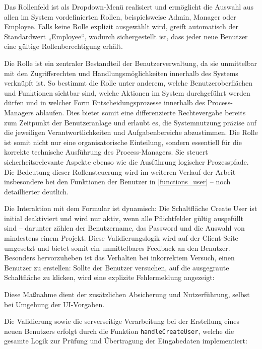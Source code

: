 
Das Rollenfeld ist als Dropdown-Menü realisiert und ermöglicht die Auswahl aus allen im System vordefinierten Rollen, beispielsweise Admin, Manager oder Employee. Falls keine Rolle explizit ausgewählt wird, greift automatisch der Standardwert „Employee“, wodurch sichergestellt ist, dass jeder neue Benutzer eine gültige Rollenberechtigung erhält.

Die Rolle ist ein zentraler Bestandteil der Benutzerverwaltung, da sie unmittelbar mit den Zugriffsrechten und Handlungsmöglichkeiten innerhalb des Systems verknüpft ist. So bestimmt die Rolle unter anderem, welche Benutzeroberflächen und Funktionen sichtbar sind, welche Aktionen im System durchgeführt werden dürfen und in welcher Form Entscheidungsprozesse innerhalb des Process-Managers ablaufen. Dies bietet somit eine differenzierte Rechtevergabe bereits zum Zeitpunkt der Benutzeranlage und erlaubt es, die Systemnutzung präzise auf die jeweiligen Verantwortlichkeiten und Aufgabenbereiche abzustimmen.
Die Rolle ist somit nicht nur eine organisatorische Einteilung, sondern essentiell für die korrekte technische Ausführung des Process-Managers. Sie steuert sicherheitsrelevante Aspekte ebenso wie die Ausführung logischer Prozesspfade. Die Bedeutung dieser Rollensteuerung wird im weiteren Verlauf der Arbeit – insbesondere bei den Funktionen der Benutzer in \autoref{functions_user} – noch detaillierter deutlich.

Die Interaktion mit dem Formular ist dynamisch: Die Schaltfläche \glqq Create User\grqq{} ist initial deaktiviert und wird nur aktiv, wenn alle Pflichtfelder gültig ausgefüllt sind – darunter zählen der Benutzername, das Password und die Auswahl von mindestens einem Projekt. Diese Validierungslogik wird auf der Client-Seite umgesetzt und bietet somit ein unmittelbares Feedback an den Benutzer.
Besonders hervorzuheben ist das Verhalten bei inkorrektem Versuch, einen Benutzer zu erstellen: Sollte der Benutzer versuchen, auf die ausgegraute Schaltfläche zu klicken, wird eine explizite Fehlermeldung angezeigt:


Diese Maßnahme dient der zusätzlichen Absicherung und Nutzerführung, selbst bei Umgehung der UI-Vorgaben.

Die Validierung sowie die serverseitige Verarbeitung bei der Erstellung eines neuen Benutzers erfolgt durch die Funktion \texttt{handleCreateUser}, welche die gesamte Logik zur Prüfung und Übertragung der Eingabedaten implementiert:
\newpage
{}

